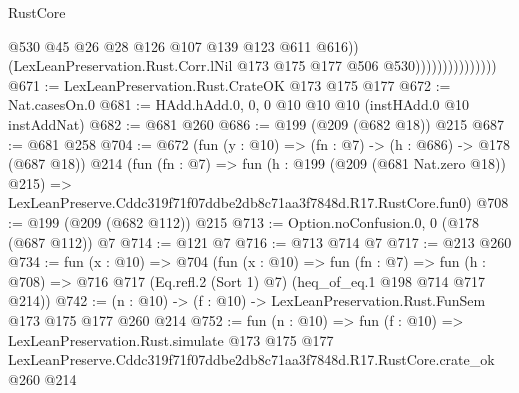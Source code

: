 \begin{lexlean}{RustCore}
\begin{coremodule}
                                    @530
                                    @45
                                    @26
                                    @28
                                    @126
                                    @107
                                    @139
                                    @123
                                    @611
                                    @616))
                                (LexLeanPreservation.Rust.Corr.lNil
                                  @173
                                  @175
                                  @177
                                  @506
                                  @530)))))))))))))))
@671 := LexLeanPreservation.Rust.CrateOK @173 @175 @177
@672 := Nat.casesOn.{0}
@681 := HAdd.hAdd.{0, 0, 0} @10 @10 @10 (instHAdd.{0} @10 instAddNat)
@682 := @681 @260
@686 := @199 (@209 (@682 @18)) @215
@687 := @681 @258
@704 := @672
    (fun (y : @10) => (fn : @7) -> (h : @686) -> @178 (@687 @18))
    @214
    (fun (fn : @7) =>
    fun (h : @199 (@209 (@681 Nat.zero @18)) @215) =>
    LexLeanPreserve.Cddc319f71f07ddbe2db8c71aa3f7848d.R17.RustCore.fun0)
@708 := @199 (@209 (@682 @112)) @215
@713 := Option.noConfusion.{0, 0} (@178 (@687 @112)) @7
@714 := @121 @7
@716 := @713 @714 @7
@717 := @213 @260
@734 := fun (x : @10) =>
  @704
    (fun (x : @10) =>
    fun (fn : @7) =>
    fun (h : @708) => @716 @717 (Eq.refl.{2} (Sort 1) @7) (heq_of_eq.{1} @198 @714 @717 @214))
@742 := (n : @10) -> (f : @10) -> LexLeanPreservation.Rust.FunSem @173 @175 @177 @260 @214
@752 := fun (n : @10) =>
  fun (f : @10) =>
  LexLeanPreservation.Rust.simulate
    @173
    @175
    @177
    LexLeanPreserve.Cddc319f71f07ddbe2db8c71aa3f7848d.R17.RustCore.crate_ok
    @260
    @214
\end{coremodule}
\end{lexlean}
